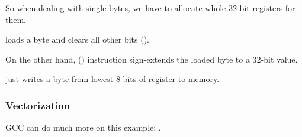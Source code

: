 So when dealing with single bytes, we have to allocate whole 32-bit registers for them.

 loads a byte and clears all other bits ().

On the other hand,  () instruction sign-extends the loaded byte to a 32-bit value.

 just writes a byte from lowest 8 bits of register to memory.

\subsubsection{Vectorization}

\Optimizing GCC can do much more on this example: .
